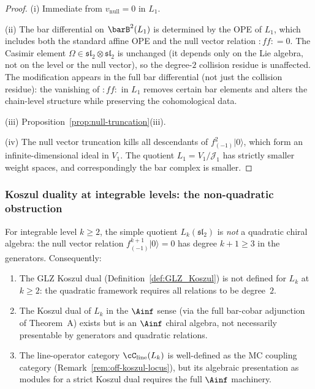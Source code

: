\begin{proof}
(i) Immediate from $v_{\mathrm{null}} = 0$ in $L_1$.

(ii) The bar differential on $\barB^2(L_1)$ is determined by
the OPE of $L_1$, which includes both the standard affine OPE
and the null vector relation $:ff: = 0$. The Casimir element
$\Omega \in \mathfrak{sl}_2 \otimes \mathfrak{sl}_2$ is
unchanged (it depends only on the Lie algebra, not on the
level or the null vector), so the degree-$2$ collision residue
is unaffected. The modification appears in the full bar
differential (not just the collision residue): the vanishing
of $:ff:$ in $L_1$ removes certain bar elements and alters the
chain-level structure while preserving the cohomological data.

(iii) Proposition~\ref{prop:null-truncation}(iii).

(iv) The null vector truncation kills all descendants of
$f_{(-1)}^2|0\rangle$, which form an infinite-dimensional
ideal in $V_1$. The quotient $L_1 = V_1/\mathcal{J}_1$ has
strictly smaller weight spaces, and correspondingly the bar
complex is smaller.
\end{proof}


\subsubsection{Koszul duality at integrable levels: the
 non-quadratic obstruction}
\label{subsubsec:koszul-integrable-obstruction}

\begin{proposition}
\label{prop:Lk-not-quadratic}
For integrable level $k \ge 2$, the simple quotient
$L_k(\mathfrak{sl}_2)$ is \emph{not} a quadratic chiral
algebra: the null vector relation
$f_{(-1)}^{k+1}|0\rangle = 0$ has degree $k + 1 \ge 3$ in
the generators. Consequently:
\begin{enumerate}[label=\textup{(\roman*)},nosep]
\item The GLZ Koszul dual
 \textup{(}Definition~\textup{\ref{def:GLZ_Koszul}}\textup{)}
 is not defined for $L_k$ at $k \ge 2$: the quadratic
 framework requires all relations to be degree~$2$.
\item The Koszul dual of $L_k$ in the $\Ainf$ sense
 \textup{(}via the full bar-cobar adjunction of
 Theorem~A\textup{)} exists but is an $\Ainf$ chiral
 algebra, not necessarily presentable by generators and
 quadratic relations.
\item The line-operator category
 $\cC_{\mathrm{line}}(L_k)$ is well-defined as the
 MC coupling category
 \textup{(}Remark~\textup{\ref{rem:off-koszul-locus}}\textup{)},
 but its algebraic presentation as modules for a strict
 Koszul dual requires the full $\Ainf$ machinery.
\end{enumerate}
\end{proposition}


